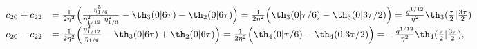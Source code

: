 \begin{equation*}
  \begin{array}{rl}
     c_{20} +c_{22} &= {1\over 2\eta^2}\Big( {\eta_{1/6}^5 \over
     \eta_{1/12}^2 ~\eta_{1/3}^2} - \th_3(0|6\tau) 
     -\th_2(0|6\tau) \Big)
     = {1\over 2\eta^2}\Big(\th_3(0|\tau/6) - \th_3(0|3\tau/2) \Big) =
     {q^{1/12}\over \eta^2} \th_3({\tau\over 2}|{3\tau\over 2}) \\ 
     c_{20} -c_{22} &= {1\over 2\eta^2}\Big( {\eta_{1/12}^2 \over
     \eta_{1/6}} - \th_3(0|6\tau)  +\th_2(0|6\tau) \Big) 
     =  {1\over 2\eta^2}\Big(\th_4(0|\tau/6) - \th_4(0|3\tau/2) \Big) =
     -{q^{1/12}\over \eta^2} \th_4({\tau\over 2}|{3\tau\over 2}), 
  \end{array}
\end{equation*}

